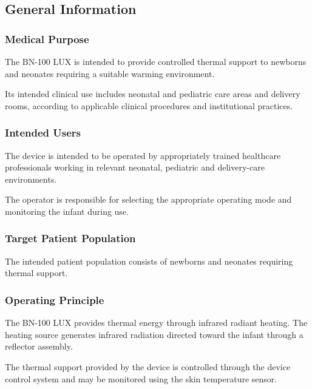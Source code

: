 ﻿
\hypertarget{p3-2-1}{}

\subsection{General Information}

\subsubsection{Medical Purpose}

The BN-100 LUX is intended to provide controlled thermal
support to newborns and neonates requiring a suitable
warming environment.

Its intended clinical use includes neonatal and pediatric
care areas and delivery rooms, according to applicable
clinical procedures and institutional practices.

\subsubsection{Intended Users}

The device is intended to be operated by appropriately
trained healthcare professionals working in relevant
neonatal, pediatric and delivery-care environments.

The operator is responsible for selecting the appropriate
operating mode and monitoring the infant during use.

\subsubsection{Target Patient Population}

The intended patient population consists of newborns and
neonates requiring thermal support.

\subsubsection{Operating Principle}

The BN-100 LUX provides thermal energy through infrared
radiant heating. The heating source generates infrared
radiation directed toward the infant through a reflector
assembly.

The thermal support provided by the device is controlled
through the device control system and may be monitored
using the skin temperature sensor.

